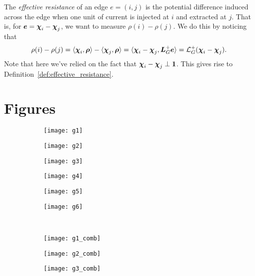The \emph{effective resistance} of an edge $e=(i,j)$ is the potential difference induced across the edge when one unit of current is injected at $i$ and extracted at $j$. That is, for $\vb*{e}=\boldsymbol{\chi}_i-\boldsymbol{\chi}_j$, we want to measure $\rho(i)-\rho(j)$. We do this by noticing that 
\[\rho(i)-\rho(j) = \langle \boldsymbol{\chi}_i,\vb*{\rho}\rangle - \langle \boldsymbol{\chi}_j,\vb*{\rho}\rangle = \langle \boldsymbol{\chi}_i-\boldsymbol{\chi}_j,\vb*{L}_G^+\vb*{e}\rangle=\mathcal{L}_G^+(\boldsymbol{\chi}_i-\boldsymbol{\chi}_j).\]
Note that here we've relied on the fact that $\boldsymbol{\chi}_i-\boldsymbol{\chi}_j\perp \vb{1}$. This gives  rise to Definition~\ref{def:effective_resistance}. 




\chapter{Figures}
\label{sec:app_figures}

\begin{figure}[h]
	\centering 
	\begin{subfigure}[b]{0.16\textwidth}
		\centering
		\texttt{[image: g1]}
	\end{subfigure}
\begin{subfigure}[b]{0.16\textwidth}
	\texttt{[image: g2]}
\end{subfigure}
\begin{subfigure}[b]{0.16\textwidth}
	\texttt{[image: g3]}
\end{subfigure}
\begin{subfigure}[b]{0.16\textwidth}
	\texttt{[image: g4]}
\end{subfigure}
\begin{subfigure}[b]{0.16\textwidth}
	\texttt{[image: g5]}
\end{subfigure}
\begin{subfigure}[b]{0.16\textwidth}
	\texttt{[image: g6]}
\end{subfigure}\\
\vspace{0.3cm}
\begin{subfigure}[b]{0.16\textwidth}
	\centering
	\texttt{[image: g1\_comb]}
\end{subfigure}
\begin{subfigure}[b]{0.16\textwidth}
	\centering
	\texttt{[image: g2\_comb]}
\end{subfigure}
\begin{subfigure}[b]{0.16\textwidth}
	\centering
	\texttt{[image: g3\_comb]}
\end{subfigure}
\begin{subfigure}[b]{0.16\textwidth}

\end{subfigure}
\end{figure}
